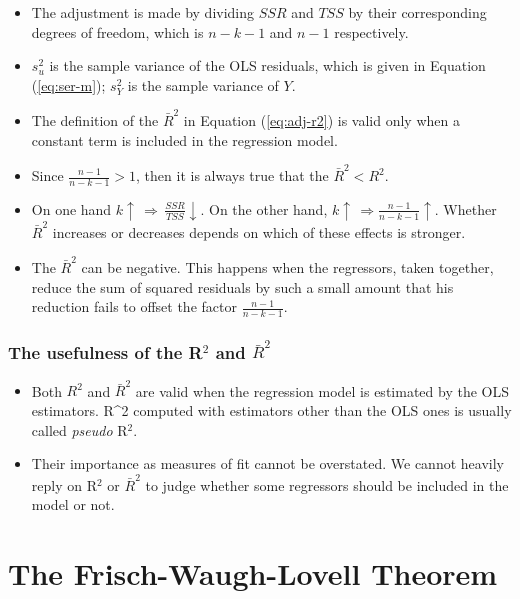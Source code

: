 \documentclass[a4paper,11pt]{article}
\begin{document}
\begin{itemize}
\item The adjustment is made by dividing \(SSR\) and \(TSS\) by their
corresponding degrees of freedom, which is \(n-k-1\) and \(n-1\)
respectively.
\item \(s^2_u\) is the sample variance of the OLS residuals, which is given
in Equation (\ref{eq:ser-m}); \(s^2_Y\) is the sample variance of \(Y\).
\item The definition of the \(\bar{R}^2\) in Equation (\ref{eq:adj-r2}) is
valid only when a constant term is included in the regression
model.
\item Since \(\frac{n-1}{n-k-1} > 1\), then it is always true that
the \(\bar{R}^2 < R^2\).
\item On one hand \(k \uparrow\, \Rightarrow\, \frac{SSR}{TSS} \downarrow\). On
the other hand, \(k \uparrow\, \Rightarrow \frac{n-1}{n-k-1}
  \uparrow\). Whether \(\bar{R}^2\) increases or decreases depends on
which of these effects is stronger.
\item The \(\bar{R}^2\) can be negative. This happens when the regressors,
taken together, reduce the sum of squared residuals by such a small
amount that his reduction fails to offset the factor \(\frac{n-1}{n-k-1}\).
\end{itemize}

\subsubsection*{The usefulness of the R\(^{\text{2}}\) and \(\bar{R}^2\)}
\label{sec:org3026894}
\begin{itemize}
\item Both \(R^2\) and \(\bar{R}^2\) are valid when the regression model is
estimated by the OLS estimators. R\^{}2 computed with estimators other
than the OLS ones is usually called \emph{pseudo} R\(^{\text{2}}\).
\item Their importance as measures of fit cannot be overstated. We cannot heavily
reply on R\(^{\text{2}}\) or \(\bar{R}^2\) to judge whether some regressors should
be included in the model or not.
\end{itemize}

\section{The Frisch-Waugh-Lovell Theorem}
\label{sec:org9bfa7a2}
\end{document}
